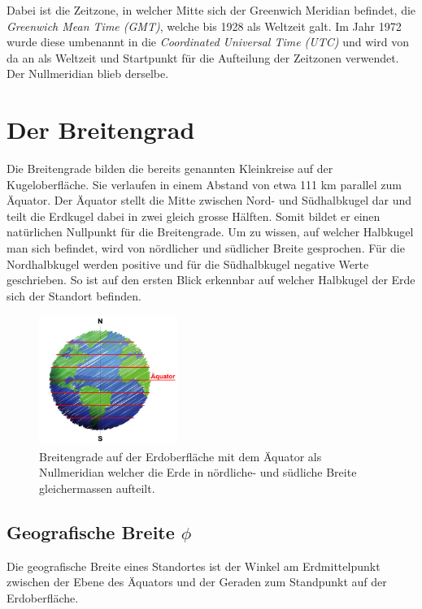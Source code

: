 \begin{refsection}
Dabei ist die Zeitzone, in welcher Mitte sich der Greenwich Meridian befindet, die \textit{Greenwich Mean Time (GMT)}, welche bis 1928 als Weltzeit galt. Im Jahr 1972 wurde diese umbenannt in die \textit{Coordinated Universal Time (UTC)} und wird von da an als Weltzeit und Startpunkt für die Aufteilung der Zeitzonen verwendet. Der Nullmeridian blieb derselbe.


\section{Der Breitengrad}
Die Breitengrade bilden die bereits genannten Kleinkreise auf der Kugeloberfläche. Sie verlaufen in einem Abstand von etwa 111 km parallel zum Äquator. Der Äquator stellt die Mitte zwischen Nord- und Südhalbkugel dar und teilt die Erdkugel dabei in zwei gleich grosse Hälften. Somit bildet er einen natürlichen Nullpunkt für die Breitengrade.
Um zu wissen, auf welcher Halbkugel man sich befindet, wird von nördlicher und südlicher Breite gesprochen. Für die Nordhalbkugel werden positive und für die Südhalbkugel negative Werte geschrieben. So ist auf den ersten Blick erkennbar auf welcher Halbkugel der Erde sich der Standort befinden.

\begin{figure}[htbp]
\centering
\includegraphics[width=0.4\textwidth]{kugel/BreiteErdkugel.jpg}
\caption{Breitengrade auf der Erdoberfläche mit dem Äquator als Nullmeridian welcher die Erde in nördliche- und südliche Breite gleichermassen aufteilt.}
\end{figure}



\subsection{Geografische Breite $\phi$}
\begin{definition}
Die geografische Breite eines Standortes ist der Winkel am Erdmittelpunkt zwischen der Ebene des Äquators und der Geraden zum Standpunkt auf der Erdoberfläche.
\end{definition}


\end{refsection}
